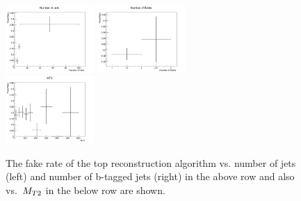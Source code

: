 \begin{figure}[htbp] 
\centering
    \includegraphics[width=0.3\textwidth]{figs/top_fake_NJets.png}
    \includegraphics[width=0.3\textwidth]{figs/top_fake_NBJets.png} \\
    \includegraphics[width=0.3\textwidth]{figs/top_fake_MT2.png}
    \caption{The fake rate of the top reconstruction algorithm vs. number of jets (left) and number of b-tagged jets (right) in the above row and also vs. $\,{M_{T2}}$ in the below row are shown.}
    \label{figtopref_fake}
\end{figure}
